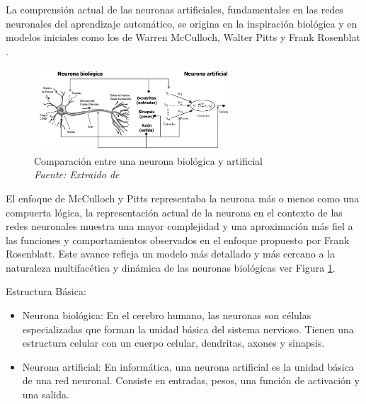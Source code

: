 La comprensión actual de las neuronas artificiales, fundamentales en las redes neuronales del aprendizaje automático, se origina en la inspiración biológica y en modelos iniciales como los de Warren McCulloch, Walter Pitts y Frank Rosenblat . 

\begin{figure}[h!]
	\centering
	\includegraphics[width=0.65\textwidth]{capitulo2/figuras/an5.png}
	\caption{Comparación entre una neurona biológica y  artificial \\ \textit{Fuente: Extraido de \protect\cite[p. 4]{lao2017procedimiento}}}
	\label{fig:an5}

\end{figure}


El enfoque de McCulloch y Pitts representaba la neurona más  o menos como una compuerta lógica, la representación actual de la neurona en el contexto de las redes neuronales muestra una mayor complejidad y una aproximación más fiel a las funciones y comportamientos observados en el enfoque propuesto por Frank Rosenblatt. Este avance refleja un modelo más detallado y más cercano a la naturaleza multifacética y dinámica de las neuronas biológicas ver Figura \ref{fig:an5}.


Estructura Básica:
\begin{itemize}
	\item	 Neurona biológica: En el cerebro humano, las neuronas son células especializadas que forman la unidad básica del sistema nervioso. Tienen una estructura celular con un cuerpo celular, dendritas, axones y sinapsis.
	\item	Neurona artificial: En informática, una neurona artificial es la unidad básica de una red neuronal. Consiste en entradas, pesos, una función de activación y una salida.
\end{itemize}


